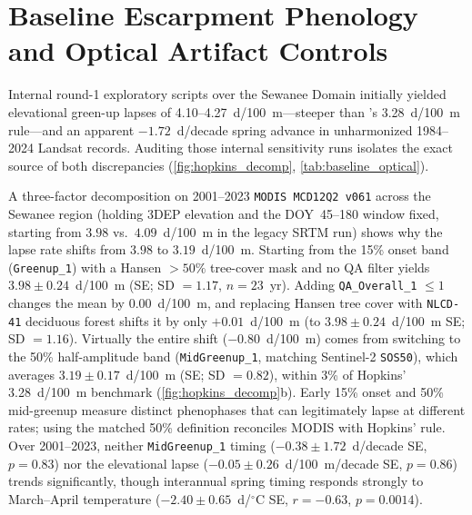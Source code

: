 \section{Baseline Escarpment Phenology and Optical Artifact Controls}
\label{sec:baseline_brdf}

Internal round-1 exploratory scripts over the Sewanee Domain initially yielded elevational green-up lapses of 4.10--4.27~d/100~m---steeper than \citet{hopkins1918}'s 3.28~d/100~m rule---and an apparent $-1.72$~d/decade spring advance in unharmonized 1984--2024 Landsat records. Auditing those internal sensitivity runs isolates the exact source of both discrepancies (\cref{fig:hopkins_decomp}, \cref{tab:baseline_optical}).

A three-factor decomposition on 2001--2023 \texttt{MODIS MCD12Q2 v061} across the Sewanee region (holding 3DEP elevation and the DOY~45--180 window fixed, starting from $3.98$ vs.\ $4.09$~d/100~m in the legacy SRTM run) shows why the lapse rate shifts from $3.98$ to $3.19$~d/100~m. Starting from the 15\% onset band (\texttt{Greenup\_1}) with a Hansen $>50\%$ tree-cover mask and no QA filter yields $3.98 \pm 0.24$~d/100~m (SE; SD $= 1.17$, $n=23$~yr). Adding \texttt{QA\_Overall\_1} $\le 1$ changes the mean by $0.00$~d/100~m, and replacing Hansen tree cover with \texttt{NLCD-41} deciduous forest shifts it by only $+0.01$~d/100~m (to $3.98 \pm 0.24$~d/100~m SE; SD $= 1.16$). Virtually the entire shift ($-0.80$~d/100~m) comes from switching to the 50\% half-amplitude band (\texttt{MidGreenup\_1}, matching Sentinel-2 \texttt{SOS50}), which averages $3.19 \pm 0.17$~d/100~m (SE; SD $= 0.82$), within 3\% of Hopkins' 3.28~d/100~m benchmark (\cref{fig:hopkins_decomp}b). Early 15\% onset and 50\% mid-greenup measure distinct phenophases that can legitimately lapse at different rates; using the matched 50\% definition reconciles MODIS with Hopkins' rule. Over 2001--2023, neither \texttt{MidGreenup\_1} timing ($-0.38 \pm 1.72$~d/decade SE, $p=0.83$) nor the elevational lapse ($-0.05 \pm 0.26$~d/100~m/decade SE, $p=0.86$) trends significantly, though interannual spring timing responds strongly to March--April temperature ($-2.40 \pm 0.65$~d/$^\circ$C SE, $r=-0.63$, $p=0.0014$).

